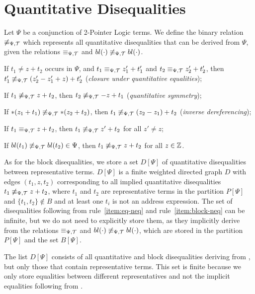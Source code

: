 \section{Quantitative Disequalities}\label{section:disequalities}

Let $\Psi$ be a conjunction of 2-Pointer Logic terms.
We define the binary relation $\not\equiv_{\Psi,\mathcal{T}}$ which represents all quantitative disequalities that can be derived from $\Psi$, given the relations $\equiv_{\Psi,\mathcal{T}}$ and $bl(\cdot)\not\equiv_{\Psi,\mathcal{T}} bl(\cdot)$.\cite{new-paper-todo}

\begin{enumerate}[label={[D\arabic*]}, ref={[D\arabic*]}]
    \setcounter{enumi}{-1} %
    \item\label{item:neq-quantitative-equalities}
    If $t_1 \neq z + t_2$ occurs in $\Psi$, and $t_1 \equiv_{\Psi,\mathcal{T}} z'_1 + t'_1$ and $t_2\equiv_{\Psi,\mathcal{T}} z'_2+t'_2$,
    then $t'_1\not\equiv_{\Psi,\mathcal{T}} (z'_2-z'_1+z)+t'_2$ (\emph{closure under quantitative equalities});
    \item\label{item:neq-quantitative-symmetry} If $t_1 \not\equiv_{\Psi,\mathcal{T}} z + t_2$, then $t_2 \not\equiv_{\Psi,\mathcal{T}} -z + t_1$ (\emph{quantitative symmetry});
    \item\label{item:inverse-deref}
    If $*(z_1 + t_1) \not\equiv_{\Psi,\mathcal{T}} *(z_2 + t_2)$, then $t_1 \not\equiv_{\Psi,\mathcal{T}} (z_2 - z_1) + t_2$
    (\emph{inverse dereferencing});
    \item\label{item:eq-neq} If $t_1 \equiv_{\Psi,\mathcal{T}} z + t_2$, then $t_1\not\equiv_{\Psi,\mathcal{T}} z'+t_2$ for all $z'\neq z$;
    \item\label{item:block-neq} If $bl(t_1) \not\equiv_{\Psi,\mathcal{T}} bl(t_2) \in \Psi$, then $t_1 \not\equiv_{\Psi,\mathcal{T}} z + t_2$ for all $z \in \mathbb{Z}$.
\end{enumerate}

As for the block disequalities, we store a set $D[\Psi]$ of quantitative disequalities between representative terms.
$D[\Psi]$ is a finite weighted directed graph $D$ with edges $(t_1,z,t_2)$ corresponding to all implied
quantitative disequalities $t_1 \not\equiv_{\Psi,\mathcal{T}} z+t_2$, where $t_1$ and $t_2$ are representative terms in the partition $P[\Psi]$ and
$\{t_1,t_2\}\not\in B$ and at least one
$t_i$ is not an address expression.
The set of disequalities following from rule~\ref{item:eq-neq} and rule~\ref{item:block-neq} can be infinite, but we do not need to explicitly store them, as they implicitly derive from the relations $\equiv_{\Psi,\mathcal{T}}$ and $bl(\cdot)\not\equiv_{\Psi,\mathcal{T}} bl(\cdot)$, which are stored in the partition $P[\Psi]$ and the set $B[\Psi]$.

The list $D[\Psi]$ consists of all quantitative and block disequalities deriving from
,
but only those that contain representative terms.
This set is finite because we only store equalities between different representatives and not the implicit equalities following from .

